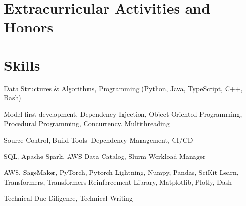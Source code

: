 \documentclass{ExpressiveResume}
\begin{document}
\section{Extracurricular Activities and Honors}



\section{Skills}
\noindent
{}
Data Structures \& Algorithms, Programming (Python, Java, TypeScript,
C++, Bash)

\noindent
{}
Model-first development, Dependency Injection,
Object-Oriented-Programming, Procedural Programming, Concurrency, Multithreading

\noindent
{} Source Control, Build Tools, Dependency Management, CI/CD

\noindent
{} SQL, Apache Spark, AWS Data Catalog,
Slurm Workload Manager

\noindent
{} AWS, SageMaker, PyTorch, Pytorch Lightning, Numpy, Pandas, SciKit Learn, Transformers, Transformers Reinforcement Library,
Matplotlib, Plotly, Dash

\noindent
{} Technical Due Diligence, Technical Writing
\end{document}
